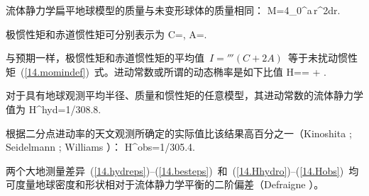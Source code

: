 流体静力学扁平地球模型的质量与未变形球体的质量相同：
\eq
M=4\pi\int_0^a\rho\,r^2dr.
\en

极惯性矩和赤道惯性矩可分别表示为
\eq
C=\eightthirds\pi{},
\en
\eq
A=\eightthirds\pi{}.
\en

与预期一样，极惯性矩和赤道惯性矩的平均值~$I=\third(C+2A)$~等于未扰动惯性矩~(\ref{14.momindef})~式。进动常数或所谓的动态椭率是如下比值
%
%
\eq
H==
{+\twofifteenth
{}}.
\en

对于具有地球观测平均半径、质量和惯性矩的任意模型，其进动常数的流体静力学值为
\eq \label{14.Hhydro}
H^{\rm hyd}=1/308.8.
\en

根据二分点进动率的天文观测所确定的实际值比该结果高百分之一（Kinoshita \citeyear{kinoshita77}; Seidelmann \citeyear{seidelmann82}; Williams \citeyear{williams94}）：
\eq \label{14.Hobs}
H^{\rm obs}=1/305.4.
\en

两个大地测量差异~(\ref{14.hydreps})--(\ref{14.besteps})~和~(\ref{14.Hhydro})--(\ref{14.Hobs})~均可度量地球密度和形状相对于流体静力学平衡的二阶偏差（Defraigne \citeyear{defraigne97}）。
%
%

